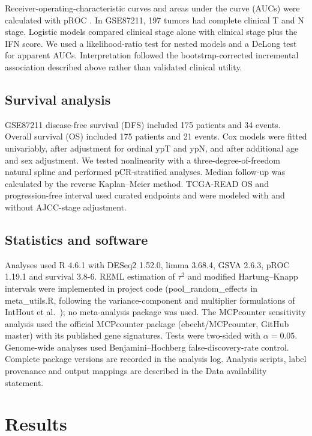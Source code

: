\documentclass[11pt,a4paper]{article}
\begin{document}
Receiver-operating-characteristic curves and areas under the curve (AUCs) were calculated with pROC \cite{Robin}. In GSE87211, 197 tumors had complete clinical T and N stage. Logistic models compared clinical stage alone with clinical stage plus the IFN score. We used a likelihood-ratio test for nested models and a DeLong test for apparent AUCs. Interpretation followed the bootstrap-corrected incremental association described above rather than validated clinical utility.

\subsection{Survival analysis}

GSE87211 disease-free survival (DFS) included 175 patients and 34 events. Overall survival (OS) included 175 patients and 21 events. Cox models were fitted univariably, after adjustment for ordinal ypT and ypN, and after additional age and sex adjustment. We tested nonlinearity with a three-degree-of-freedom natural spline and performed pCR-stratified analyses. Median follow-up was calculated by the reverse Kaplan--Meier method. TCGA-READ OS and progression-free interval used curated endpoints \cite{Liu} and were modeled with and without AJCC-stage adjustment.

\subsection{Statistics and software}

Analyses used R 4.6.1 with DESeq2 1.52.0, limma 3.68.4, GSVA 2.6.3, pROC 1.19.1 and survival 3.8-6. REML estimation of $\tau^2$ and modified Hartung--Knapp intervals were implemented in project code (pool\_random\_effects in meta\_utils.R, following the variance-component and multiplier formulations of IntHout et al.~\cite{IntHout}); no meta-analysis package was used. The MCPcounter sensitivity analysis used the official MCPcounter package (ebecht/MCPcounter, GitHub master) with its published gene signatures. Tests were two-sided with $\alpha=0.05$. Genome-wide analyses used Benjamini--Hochberg false-discovery-rate control. Complete package versions are recorded in the analysis log. Analysis scripts, label provenance and output mappings are described in the Data availability statement.

\section{Results}
\end{document}

